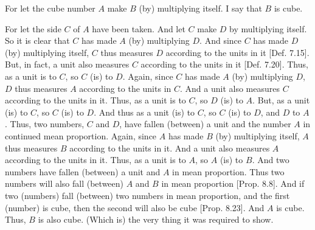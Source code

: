 \begin{Parallel}{}{}
{\epsfysize=1.2in
\centerline{}

For let the cube number $A$ make $B$ (by) multiplying itself. I say
that $B$ is  cube.

For let the side $C$ of $A$ have been taken. And let $C$ make
$D$ by multiplying itself. So it is clear that $C$ has made $A$ (by)
multiplying $D$. And since $C$ has made $D$ (by) multiplying itself,
$C$ thus measures $D$ according to the units in it [Def. 7.15]. But, in fact, a unit also measures
$C$ according to the units in it [Def. 7.20]. 
Thus, as a unit is to $C$, so $C$ (is) to $D$. Again, since $C$ has
made $A$ (by) multiplying $D$, $D$ thus measures $A$ according to
the units in $C$. And a unit also measures $C$ according to the units in it. Thus, as a unit is to $C$, so $D$ (is) to $A$. But, as a unit (is) to $C$, so
$C$ (is) to $D$. And thus as a unit (is) to $C$, so $C$ (is) to $D$, and
$D$ to $A$. Thus, two numbers, $C$ and $D$, have fallen (between) a unit
and the number $A$ in continued  mean proportion. Again, since $A$ has made $B$ (by) multiplying itself, $A$ thus measures $B$ according to the units in it.
And a unit also measures $A$ according to the units in it. Thus, as a
unit is to $A$, so $A$ (is) to $B$. And two numbers have
fallen (between) a unit and $A$ in mean proportion. Thus two
numbers will also fall (between) $A$ and $B$ in mean proportion [Prop. 8.8].
And if two
(numbers) fall (between) two numbers in mean proportion, and the
first (number) is cube, then the second will also be  cube 
[Prop. 8.23]. And $A$ is cube.
Thus, $B$ is also  cube. (Which is) the very thing it was required to show.}
\end{Parallel}


